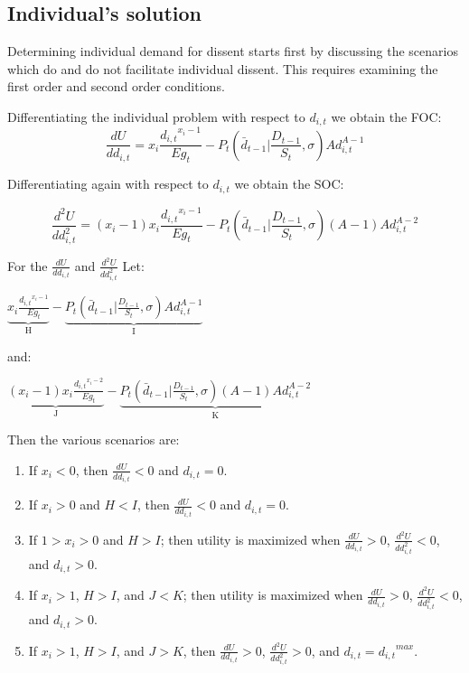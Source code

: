 \documentclass[12pt]{article}
\begin{document}
\begin{spacing}{1.5}
 
\subsection{Individual's solution}


Determining individual demand for dissent starts first by discussing the scenarios which do and do not facilitate individual dissent. This requires examining the first order and second order conditions. 
 
\vspace{.5 em}
\noindent Differentiating the individual problem with respect to $d_{i,t}$ we obtain the FOC: 
\begin{equation}
\frac{dU}{dd_{i,t}} = x_i \frac{{d_{i,t}}^{x_i -1}}{E g_t} - P_t \left(\bar{d}_{t-1} \Big|\frac{D_{t-1}}{S_t},\sigma \right)Ad_{i,t}^{A-1}  
\end{equation}

\noindent Differentiating again with respect to $d_{i,t}$ we obtain the SOC: 

\begin{equation}
\frac{d^2U}{dd_{i,t}^2}=(x_i -1) x_i \frac{{d_{i,t}}^{x_i -1}}{E g_t} - P_t \left(\bar{d}_{t-1} \Big|\frac{D_{t-1}}{S_t},\sigma \right)(A-1)Ad_{i,t}^{A-2}  
\end{equation}

\noindent For the $\frac{dU}{dd_{i,t}}$ and $\frac{d^2U}{dd_{i,t}^2}$ Let:    
\begin{center}
$\underbrace{ x_i \frac{{d_{i,t}}^{x_i -1}}{E g_t}}_\textrm{H} - \underbrace{P_t \left(\bar{d}_{t-1} \Big|\frac{D_{t-1}}{S_t},\sigma \right)Ad_{i,t}^{A-1}}_\textrm{I}$  	
\end{center}

\noindent and: 

\begin{center}
$\underbrace{(x_i -1) x_i \frac{{d_{i,t}}^{x_i -2}}{E g_t}}_\textrm{J} -\underbrace{P_t \left(\bar{d}_{t-1}\Big|\frac{D_{t-1}}{S_t},\sigma \right)(A-1)Ad_{i,t}^{A-2}}_\textrm{K}$  
\end{center}

\noindent Then the various scenarios are: 
\begin{enumerate}
\item If $x_i<0$, then $\frac{dU}{dd_{i,t}} < 0$ and $d_{i,t}=0$. 
\item If $x_i>0$ and $H<I$, then $\frac{dU}{dd_{i,t}} < 0$ and $d_{i,t}=0$. 
\item If $1>x_i>0$ and $H>I$; then utility is maximized when $\frac{dU}{dd_{i,t}} > 0$, $\frac{d^2U}{dd_{i,t}^2}<0$, and $d_{i,t}>0$.  
\item If $x_i>1$, $H>I$, and $J<K$; then utility is maximized when $\frac{dU}{dd_{i,t}} > 0$, $\frac{d^2U}{dd_{i,t}^2}<0$, and $d_{i,t}>0$. 
\item If $x_i>1$, $H>I$, and $J>K$, then $\frac{dU}{dd_{i,t}} > 0$, $\frac{d^2U}{dd_{i,t}^2}>0$, and $d_{i,t}={d_{i,t}}^{max} $. 
\end{enumerate}


\end{spacing}
\end{document}
